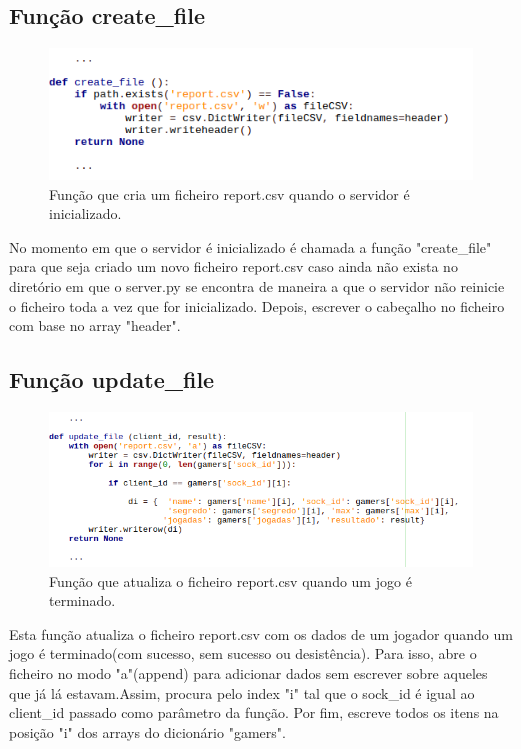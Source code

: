 \documentclass{report}
\begin{document}
\subsection{Função \textbf{create\_file}}
\begin{figure}[H]
	\centering
	\includegraphics[scale=0.65]{create_file}	
	\caption{Função que cria um ficheiro report.csv quando o servidor é inicializado.}
\end{figure}

No momento em que o servidor é inicializado é chamada a função "create\_file" para que seja criado um novo ficheiro report.csv caso ainda não exista no diretório em que o server.py se encontra de maneira a que o servidor não reinicie o ficheiro toda a vez que for inicializado. Depois, escrever o cabeçalho no ficheiro com base no array "header".

\subsection{Função \textbf{update\_file}}
\begin{figure}[H]
	\centering
	\includegraphics[scale=0.65]{update_file}	
	\caption{Função que atualiza o ficheiro report.csv quando um jogo é terminado.}
\end{figure}

Esta função atualiza o ficheiro report.csv com os dados de um jogador quando um jogo é terminado(com sucesso, sem sucesso ou desistência). Para isso, abre o ficheiro no modo "a"(append) para adicionar dados sem escrever sobre aqueles que já lá estavam.Assim, procura pelo index "i" tal que o sock\_id é igual ao client\_id passado como parâmetro da função. Por fim, escreve todos os itens na posição "i" dos arrays do dicionário "gamers". 
\end{document}
